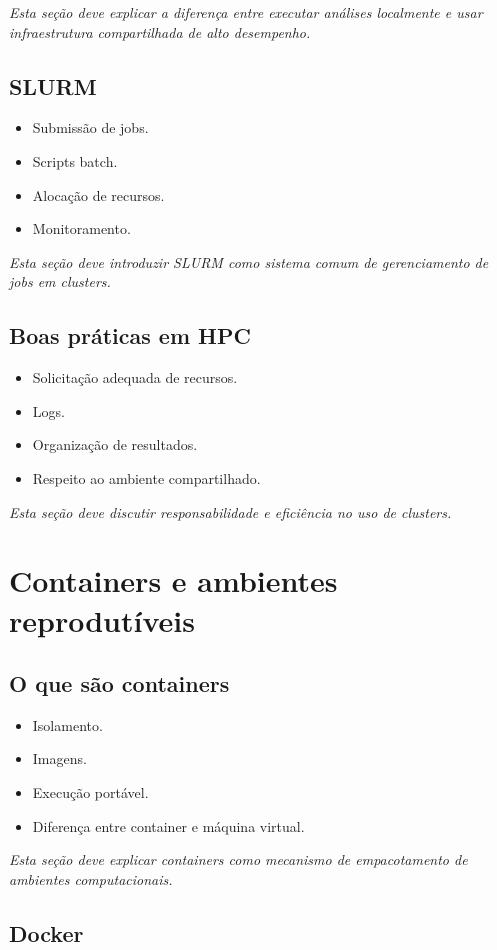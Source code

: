\documentclass[12pt,openany]{book}
\newcommand{\placeholder}[1]{
    \par\medskip
    \noindent\textit{#1}
    \par\medskip
}
\newcommand{\topicos}[1]{
    \begin{itemize}
        #1
    \end{itemize}
}
\begin{document}
\begin{refsection}
\placeholder{Esta seção deve explicar a diferença entre executar análises localmente e usar infraestrutura compartilhada de alto desempenho.}

\section{SLURM}

\topicos{
    \item Submissão de jobs.
    \item Scripts batch.
    \item Alocação de recursos.
    \item Monitoramento.
}

\placeholder{Esta seção deve introduzir SLURM como sistema comum de gerenciamento de jobs em clusters.}

\section{Boas práticas em HPC}

\topicos{
    \item Solicitação adequada de recursos.
    \item Logs.
    \item Organização de resultados.
    \item Respeito ao ambiente compartilhado.
}

\placeholder{Esta seção deve discutir responsabilidade e eficiência no uso de clusters.}

\chapter{Containers e ambientes reprodutíveis}

\section{O que são containers}

\topicos{
    \item Isolamento.
    \item Imagens.
    \item Execução portável.
    \item Diferença entre container e máquina virtual.
}

\placeholder{Esta seção deve explicar containers como mecanismo de empacotamento de ambientes computacionais.}

\section{Docker}


\end{refsection}
\end{document}
